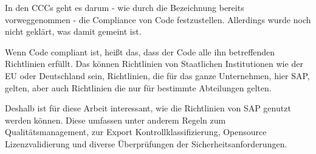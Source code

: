 \documentclass[../main.tex]{subfiles}
\begin{document}
In den \glspl{CCC} geht es darum - wie durch die Bezeichnung bereits vorweggenommen - die Compliance von Code festzustellen. Allerdings wurde noch nicht geklärt, was damit gemeint ist.

Wenn Code compliant ist, heißt das, dass der Code alle ihn betreffenden Richtlinien erfüllt.
Das können Richtlinien von Staatlichen Institutionen wie der \acrshort{EU} oder Deutschland sein, Richtlinien, die für das ganze Unternehmen, hier SAP, gelten, aber auch Richtlinien die nur für bestimmte Abteilungen gelten.

Deshalb ist für diese Arbeit interessant, wie die Richtlinien von SAP genutzt werden können.
Diese umfassen unter anderem Regeln zum Qualitätsmanagement, zur Export Kontrollklassifizierung, Opensource Lizenzvalidierung und diverse Überprüfungen der Sicherheitsanforderungen.
\end{document}
